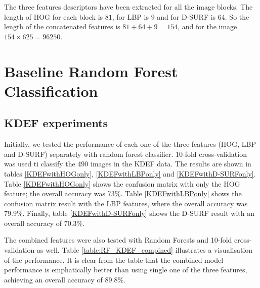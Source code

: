 The three features descriptors have been extracted for all the image blocks. The length of HOG for each block is $81$, for LBP is $9$ and for D-SURF is $64$. So the length of the concatenated features is $81+64+9= 154$, and for the image $154\times625=96250$.

%









%








%
%

\section{Baseline Random Forest Classification}
\label{sec:BaslineRandomForest}

\subsection{KDEF experiments}
Initially,  we tested the performance of each one of the three features (HOG, LBP and D-SURF) separately with random forest classifier. 10-fold cross-validation was used ti classify the 490 images in the  KDEF data. The results are shown in tables \ref{KDEFwithHOGonly}, \ref{KDEFwithLBPonly} and \ref{KDEFwithD-SURFonly}. 
Table \ref{KDEFwithHOGonly} shows the confusion matrix with only the HOG feature; the overall accuracy was 73\%. Table \ref{KDEFwithLBPonly} shows the confusion matrix result with the LBP features, where the overall accuracy was 79.9\%. Finally, table \ref{KDEFwithD-SURFonly} shows the D-SURF result with an overall accuracy of 70.3\%. 


The combined features were also tested with Random Forests and 10-fold cross-validation as well. Table  \ref{table:RF_KDEF_compined} illustrates a visualisation of the performance. It is clear from the table that the combined model performance is emphatically better than using single one of the three features, achieving an overall accuracy of 89.8\%. 









